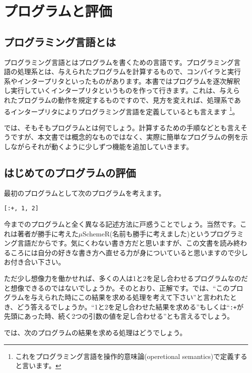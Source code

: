 \chapter{プログラムと評価\hspace{-3mm}}

\section{プログラミング言語とは}

プログラミング言語とはプログラムを書くための言語です。プログラミング言
語の処理系とは、与えられたプログラムを計算するもので、コンパイラと実行
系やインタープリタといったものがあります。本書ではプログラムを逐次解釈
し実行していくインタープリタというものを作って行きます。これは、与えら
れたプログラムの動作を規定するものですので、見方を変えれば、処理系であ
るインタープリタによりプログラミング言語を定義しているとも言えます
\footnote{これをプログラミング言語を操作的意味論(operetional semantics)で定義すると言います。}。

では、そもそもプログラムとは何でしょう。計算するための手順などとも言えそうですが、本文書では概念的なものではなく、実際に簡単なプログラムの例を示しながらそれが動くように少しずつ機能を追加していきます。

\section{はじめてのプログラムの評価}

最初のプログラムとして次のプログラムを考えます。

\begin{lstlisting}
[:+, 1, 2]
\end{lstlisting}

今までのプログラムと全く異なる記述方法に戸惑うことでしょう。当然です。これは著者が勝手に考えた$\mu$SchemeR(名前も勝手に考えました)というプログラミング言語だからです。気にくわない書き方だと思いますが、この文書を読み終わるころには自分の好きな書き方へ直せる力が身についていると思いますので少しお付き合い下さい。

ただ少し想像力を働かせれば、多くの人は1と2を足し合わせるプログラムなのだと想像できるのではないでしょうか。そのとおり、正解です。では、“このプログラムを与えられた時にこの結果を求める処理を考えて下さい”と言われたとき、どう答えるでしょうか。“1と2を足し合わせた結果を求める”もしくは“{\tt :+}が先頭にあった時、続く2つの引数の値を足し合わせる”とも言えるでしょう。

では、次のプログラムの結果を求める処理はどうでしょう。

